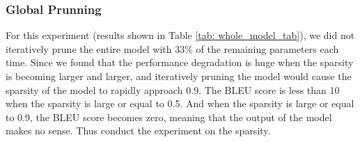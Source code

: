 \documentclass[11pt]{article}
\begin{document}
\subsubsection{Global Prunning}
For this experiment (results shown in Table \ref{tab: whole_model_tab}), we did not iteratively prune the entire model with 33\% of the remaining parameters each time. Since we found that the performance degradation is huge when the sparsity is becoming larger and larger, and iteratively pruning the model would cause the sparsity of the model to rapidly approach 0.9. The BLEU score is less than 10 when the sparsity is large or equal to 0.5. And when the sparsity is large or equal to 0.9, the BLEU score becomes zero, meaning that the output of the model makes no sense. Thus conduct the experiment on the sparsity.

\begin{table}[h!]
\centering
{}
\caption{Results of Global L1 Unstructured Pruning}
\label{tab: whole_model_tab}
\end{table}
\end{document}
